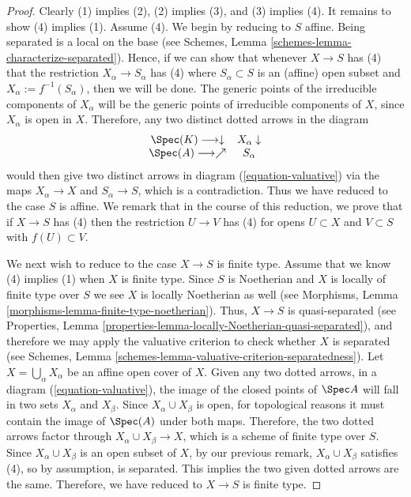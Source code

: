 \begin{proof}
Clearly (1) implies (2), (2) implies (3), and (3) implies (4).  It
remains to show (4) implies (1). Assume (4).
We begin by reducing to $S$ affine.  Being separated is a local
on the base (see
Schemes, Lemma \ref{schemes-lemma-characterize-separated}).
Hence, if we can show that whenever
$X \to S$ has (4) that the restriction $X_\alpha \to S_\alpha$ has (4)
where $S_\alpha \subset S$ is an (affine) open subset and $X_\alpha :=
f^{-1}(S_\alpha)$, then we will be done.  The
generic points of the irreducible components of $X_\alpha$ will be the
generic points of irreducible components of $X$, since $X_\alpha$ is
open in $X$.  Therefore, any two distinct dotted arrows in the diagram
\begin{equation}
\label{equation-valuative-alpha}
\begin{array}{cc}\Spec(K) \longrightarrow\downarrow & X_\alpha \downarrow \\ \Spec(A) \longrightarrow\nearrow & S_\alpha\end{array}
\end{equation}
would then give two distinct arrows in diagram
(\ref{equation-valuative}) via the maps $X_\alpha \to X$ and
$S_\alpha \to S$, which is a contradiction.  Thus we have reduced
to the case $S$ is affine.  We remark that in the course of this
reduction, we prove that if $X \to S$ has (4) then the restriction $U
\to V$ has (4) for opens $U \subset X$ and $V \subset S$ with
$f(U) \subset V$.

\medskip\noindent
We next wish to reduce to the case $X \to S$ is finite type.  Assume
that we know (4) implies (1) when $X$ is finite type. Since
$S$ is Noetherian and $X$ is locally of finite type over $S$
we see $X$ is locally Noetherian as well (see Morphisms,
Lemma \ref{morphisms-lemma-finite-type-noetherian}).
Thus, $X \to S$ is quasi-separated (see
Properties, Lemma \ref{properties-lemma-locally-Noetherian-quasi-separated}),
and therefore we may apply the valuative criterion to check whether $X$
is separated (see
Schemes, Lemma \ref{schemes-lemma-valuative-criterion-separatedness}).
Let $X = \bigcup_\alpha X_\alpha$ be an affine open
cover of $X$. Given any two dotted arrows, in a diagram
(\ref{equation-valuative}), the image of the closed points of
$\Spec A$ will
fall in two sets $X_\alpha$ and $X_\beta$.  Since $X_\alpha \cup
X_\beta$ is open, for topological reasons it must contain the image of
$\Spec(A)$ under both maps. Therefore, the two dotted arrows factor
through $X_\alpha \cup X_\beta \to X$, which is a scheme of finite type over
$S$. Since $X_\alpha \cup X_\beta$ is an open subset of $X$, by our
previous remark, $X_\alpha \cup X_\beta$ satisfies (4), so by
assumption, is separated.  This implies the two given dotted
arrows are the same. Therefore, we have reduced to $X \to S$ is finite type.


\end{proof}
